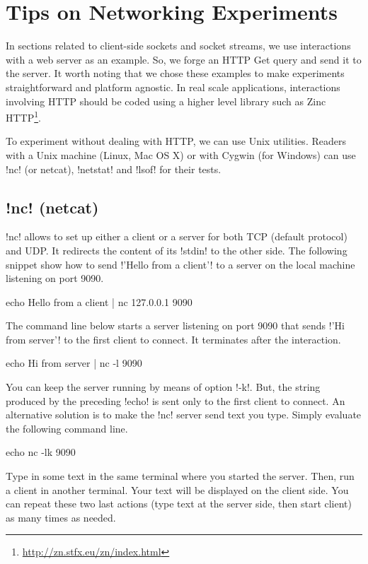 \documentclass[a4paper,10pt,twoside]{book}
\begin{document}
\section{Tips on Networking Experiments}
In sections related to client-side sockets and socket streams, we use interactions with a web server as an example.
So, we forge an HTTP Get query and send it to the server.
It worth noting that we chose these examples to make experiments straightforward and platform agnostic.
In real scale applications, interactions involving HTTP should be coded using a higher level library such as Zinc HTTP\footnote{\url{http://zn.stfx.eu/zn/index.html}}.

To experiment without dealing with HTTP, we can use Unix utilities.
Readers with a Unix machine (Linux, Mac OS X) or with Cygwin (for Windows) can use \ct!nc! (or netcat), \ct!netstat! and \ct!lsof! for their tests.

\subsection{\ct!nc! (netcat)}
\ct!nc! allows to set up either a client or a server for both TCP (default protocol) and UDP.
It redirects the content of its \ct!stdin! to the other side.
The following snippet show how to send \ct!'Hello from a client'! to a server on the local machine listening on port 9090.
\begin{code}{}
echo Hello from a client | nc 127.0.0.1 9090 
\end{code}

The command line below starts a server listening on port 9090 that sends \ct!'Hi from server'! to the first client to connect.
It terminates after the interaction.
\begin{code}{}
echo Hi from server | nc -l 9090 
\end{code}

You can keep the server running by means of option \ct!-k!.
But, the string produced by the preceding \ct!echo! is sent only to the first client to connect.
An alternative solution is to make the \ct!nc! server send text you type.
Simply evaluate the following command line. 
\begin{code}{}
echo nc -lk 9090 
\end{code}

Type in some text in the same terminal where you started the server.
Then, run a client in another terminal.
Your text will be displayed on the client side.
You can repeat these two last actions (type text at the server side, then start client) as many times as needed.
\end{document}
